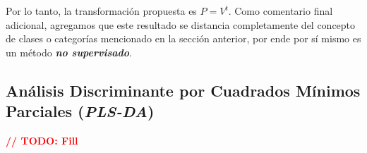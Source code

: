 Por lo tanto, la transformaci\'on propuesta es $P = V^{t}$. Como comentario final adicional, agregamos que este resultado se distancia completamente del concepto de clases o categor\'ias mencionado en la secci\'on anterior, por ende por s\'i mismo es un m\'etodo \textbf{\textit{no supervisado}}.

\subsection{An\'alisis Discriminante por Cuadrados M\'inimos Parciales (\textit{PLS-DA})}

\textbf{\textcolor{red}{// TODO: Fill}}